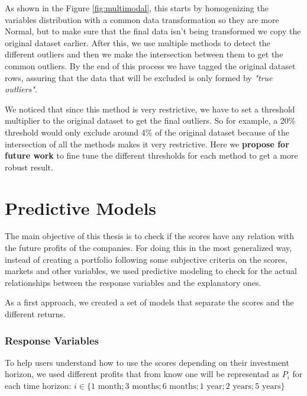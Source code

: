 \documentclass[11pt,english,a4paper,hidelinks]{book}
\begin{document}
\vspace{0.5cm}
\noindent As shown in the Figure \ref{fig:multimodal}, this starts by homogenizing the variables distribution with a common data transformation so they are more Normal, but to make sure that the final data isn't being transformed we copy the original dataset earlier. After this, we use multiple methods to detect the different outliers and then we make the intersection between them to get the common outliers. By the end of this process we have tagged the original dataset rows, assuring that the data that will be excluded is only formed by \textit{"true outliers"}.

\vspace{0.5cm}
\noindent We noticed that since this method is very restrictive, we have to set a threshold multiplier to the original dataset to get the final outliers. So for example, a 20\% threshold would only exclude around 4\% of the original dataset because of the intersection of all the methods makes it very restrictive. Here we \textbf{propose for future work} to fine tune the different thresholds for each method to get a more robust result.


\section{Predictive Models}
The main objective of this thesis is to check if the scores have any relation with the future profits of the companies. For doing this in the most generalized way, instead of creating a portfolio following some subjective criteria on the scores, markets and other variables, we used predictive modeling to check for the actual relationships between the response variables and the explanatory ones.

\vspace{0.5cm}
\noindent As a first approach, we created a set of models that separate the scores and the different returns. 

\subsubsection{Response Variables}
To help users understand how to use the scores depending on their investment horizon, we used different profits that from know one will be representad as \(P_i\) for each time horizon: \(i \in \{1 \text{ month}; 3 \text{ months}; 6 \text{ months}; 1 \text{ year}; 2 \text{ years}; 5 \text{ years}\}\)
\end{document}
